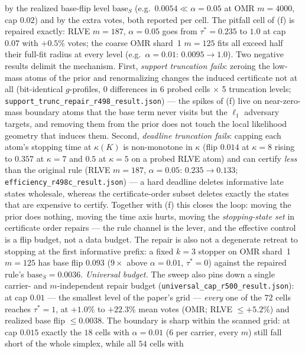\documentclass{article}
\theoremstyle{definition}
\theoremstyle{remark}
\begin{document}
by the realized base-flip level $\mathrm{base}_S$ (e.g.\
$0.0054\ll\alpha{=}0.05$ at OMR $m{=}4000$, cap $0.02$) and by the
extra votes, both reported per cell. The pitfall cell of (f) is
repaired exactly: RLVE $m{=}187$, $\alpha{=}0.05$ goes from
$\tau^*=0.235$ to $1.0$ at cap $0.07$ with $+0.5\%$ votes; the coarse
OMR shard~1 $m{=}125$ fits all exceed half their full-fit radius at
every level (e.g.\ $\alpha{=}0.01$: $0.0095\to1.0$). Two negative
results delimit the mechanism. First, \emph{support truncation fails}:
zeroing the low-mass atoms of the prior and renormalizing changes the
induced certificate not at all (bit-identical $g$-profiles, 0
differences in 6 probed cells $\times$ 5 truncation levels;
\texttt{support\_trunc\_repair\_r498\_result.json}) --- the spikes of
(f) live on near-zero-mass boundary atoms that the base term never
visits but the $\ell_1$ adversary targets, and removing them from the
prior does not touch the local likelihood geometry that induces them.
Second, \emph{deadline truncation fails}: capping each atom's stopping
time at $\kappa(K)$ is non-monotone in $\kappa$ (flip $0.014$ at
$\kappa{=}8$ rising to $0.357$ at $\kappa{=}7$ and $0.5$ at
$\kappa{=}5$ on a probed RLVE atom) and can certify \emph{less} than
the original rule (RLVE $m{=}187$, $\alpha{=}0.05$: $0.235\to0.133$;
\texttt{efficiency\_r498c\_result.json}) --- a hard deadline deletes
informative late states wholesale, whereas the certificate-order
subset deletes exactly the states that are expensive to certify.
Together with (f) this closes the loop: moving the prior does nothing,
moving the time axis hurts, moving the \emph{stopping-state set} in
certificate order repairs --- the rule channel is the lever, and the
effective control is a flip budget, not a data budget. The repair is
also not a degenerate retreat to stopping at the first informative
prefix: a fixed $k{=}3$ stopper on OMR shard~1 $m{=}125$ has base flip
$0.093$ ($9\times$ above $\alpha{=}0.01$, $\tau^*=0$) against the
repaired rule's $\mathrm{base}_S=0.0036$.
\emph{Universal budget.} The sweep also pins down a single
carrier- and $m$-independent repair budget
(\texttt{universal\_cap\_r500\_result.json}): at cap $0.01$ ---
the smallest level of the paper's grid --- \emph{every} one of the
$72$ cells reaches $\tau^*=1$, at $+1.0\%$ to $+22.3\%$ mean votes
(OMR; RLVE $\le+5.2\%$) and realized base flip $\le0.0038$. The
boundary is sharp within the scanned grid: at cap $0.015$ exactly
the $18$ cells with $\alpha{=}0.01$ ($6$ per carrier, every $m$)
still fall short of the whole simplex, while all $54$ cells with
\end{document}
